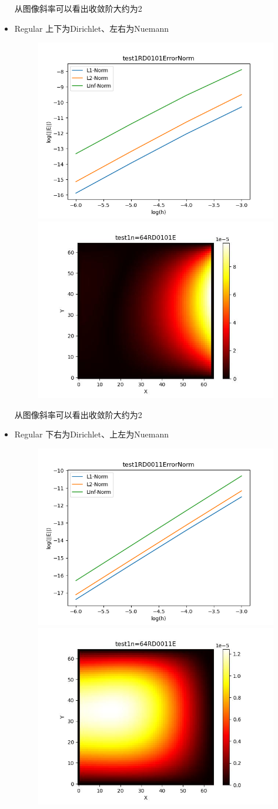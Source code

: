 \documentclass{article}
\begin{document}
\begin{itemize}
    从图像斜率可以看出收敛阶大约为2
    \newpage
    \item Regular 上下为Dirichlet、左右为Nuemann
    \begin{figure}[h]
        \centering
        \includegraphics[width=0.35\linewidth]{test1RD0101ErrorNormjpg.png}
        \includegraphics[width=0.35\linewidth]{test1n=64RD0101E.jpg}
    \end{figure}

    从图像斜率可以看出收敛阶大约为2
    \item Regular 下右为Dirichlet、上左为Nuemann
    \begin{figure}[h]
        \centering
        \includegraphics[width=0.35\linewidth]{test1RD0011ErrorNormjpg.png}
        \includegraphics[width=0.35\linewidth]{test1n=64RD0011E.jpg}
    \end{figure}


\end{itemize}
\end{document}
